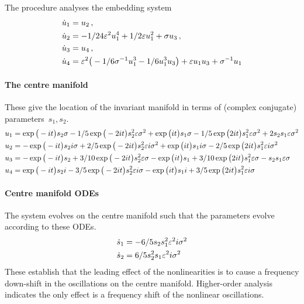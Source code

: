 The procedure analyses the embedding system
\begin{align*}&
\dot u_{1}=u_2 \,,\\&
\dot u_{2}=-1/24 \varepsilon^{2} u_1^{4}+1/2 \varepsilon u_1^{2}+\sigma  u_3 \,,\\&
\dot u_{3}=u_4 \,,\\&
\dot u_{4}=\varepsilon^{2} \big(-1/6 \sigma ^{-1} u_1^{3}-1/6 u_1^{3} u_3
\big)+\varepsilon u_1 u_3+\sigma ^{-1} u_1
\end{align*}



\paragraph{The centre manifold} 
These give the location of the invariant manifold in
terms of (complex conjugate) parameters~\(s_1,s_2\).
\begin{align*}&
u_{1}=\exp \big(-i t\big) s_{2} \sigma -1/5 \exp \big(-2 i t\big) s_{2}
^{2} \varepsilon \sigma ^{2}+\exp \big(i t\big) s_{1} \sigma -1/5 \exp \big(2 i
 t\big) s_{1}^{2} \varepsilon \sigma ^{2}+2 s_{2} s_{1} \varepsilon \sigma ^{2}
\\&
u_{2}=-\exp \big(-i t\big) s_{2} i \sigma +2/5 \exp \big(-2 i t\big) s_{
2}^{2} \varepsilon i \sigma ^{2}+\exp \big(i t\big) s_{1} i \sigma -2/5 \exp 
\big(2 i t\big) s_{1}^{2} \varepsilon i \sigma ^{2}
\\&
u_{3}=-\exp \big(-i t\big) s_{2}+3/10 \exp \big(-2 i t\big) s_{2}^{2} 
\varepsilon \sigma -\exp \big(i t\big) s_{1}+3/10 \exp \big(2 i t\big) s_{1}^{2
} \varepsilon \sigma -s_{2} s_{1} \varepsilon \sigma 
\\&
u_{4}=\exp \big(-i t\big) s_{2} i-3/5 \exp \big(-2 i t\big) s_{2}^{2} 
\varepsilon i \sigma -\exp \big(i t\big) s_{1} i+3/5 \exp \big(2 i t\big) s_{1}
^{2} \varepsilon i \sigma 
\end{align*}
 
\paragraph{Centre manifold ODEs} 
The system evolves on the centre manifold such
that the parameters evolve according to these ODEs.
\begin{align*}&
\dot s_{1}=-6/5 s_{2} s_{1}^{2} \varepsilon^{2} i \sigma ^{2}
\\&
\dot s_{2}=6/5 s_{2}^{2} s_{1} \varepsilon^{2} i \sigma ^{2}
\end{align*}
These establish that the leading effect of the nonlinearities is to cause a frequency down-shift in the oscillations on the centre manifold.
Higher-order analysis indicates the only effect is a frequency shift of the nonlinear oscillations.  
